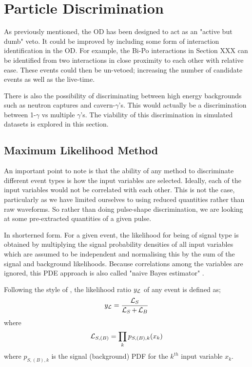 \section{Particle Discrimination}
\par
As previously mentioned, the OD has been designed to act as an "active but dumb" veto.
It could be improved by including some form of interaction identification in the OD.
For example, the Bi-Po interactions in Section XXX can be identified from two interactions in close proximity to each other with relative ease.
These events could then be un-vetoed; increasing the number of candidate events as well as the live-time.

\par
There is also the possibility of discriminating between high energy backgrounds such as neutron captures and cavern-$\gamma$'s.
This would actually be a discrimination between 1-$\gamma$ vs multiple $\gamma$'s.
The viability of this discrimination in simulated datasets is explored in this section.


\subsection{Maximum Likelihood Method}
\par
\par
An important point to note is that the ability of any method to discriminate different event types is how the input variables are selected.
Ideally, each of the input variables would not be correlated with each other.
This is not the case, particularly as we have limited ourselves to using reduced quantities rather than raw waveforms.
So rather than doing pulse-shape discrimination, we are looking at some pre-extracted quantities of a given pulse.

\par
In shorterned form. 
For a given event, the likelihood for being of signal type is obtained by multiplying the signal probability densities of all input variables which are assumed to be independent and normalising this by the sum of the signal and background likelihoods.
Because correlations among the variables are ignored, this PDE approach is also called "naive Bayes estimator" \cite{TMVA_ref}.

Following the style of \cite{TMVA_ref}, the likelihood ratio $y_{\operatorname{\mathcal{L}}}$ of any event is defined as;
\begin{equation}
    y_{\operatorname{\mathcal{L}}} = \frac{\operatorname{\mathcal{L}}_{S}}{\operatorname{\mathcal{L}}_{S} + \operatorname{\mathcal{L}}_{B}}
\end{equation}
where
\begin{equation}
    \operatorname{\mathcal{L}}_{S,(B)} = \prod_k p_{S,(B),k}(x_k)
\end{equation}
where $p_{S,(B),k}$ is the signal (background) PDF for the $k^{th}$ input variable $x_k$.


